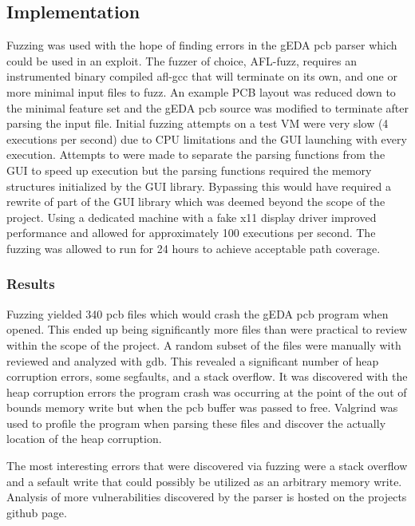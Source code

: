 \documentclass[12pt]{article}
\begin{document}
\subsection{Implementation} 
Fuzzing was used with the hope of finding errors in the gEDA pcb parser which could be used in an exploit. The fuzzer of choice, AFL-fuzz, requires an instrumented binary compiled afl-gcc that will terminate on its own, and one or more minimal input files to fuzz. An example PCB layout was reduced down to the minimal feature set and the gEDA pcb source was modified to terminate after parsing the input file. Initial fuzzing attempts on a test VM were very slow (4 executions per second) due to CPU limitations and the GUI launching with every execution. Attempts to were made to separate the parsing functions from the GUI to speed up execution but the parsing functions required the memory structures initialized by the GUI library. Bypassing this would have required a rewrite of part of the GUI library which was deemed beyond the scope of the project. Using a dedicated machine with a fake x11 display driver improved performance and allowed for approximately 100 executions per second. The fuzzing was allowed to run for 24 hours to achieve acceptable path coverage. 

\subsubsection{Results}
Fuzzing yielded 340 pcb files which would crash the gEDA pcb program when opened. This ended up being significantly more files than were practical to review within the scope of the project. A random subset of the files were manually with reviewed and analyzed with gdb. This revealed a significant number of heap corruption errors, some segfaults, and a stack overflow. It was discovered with the heap corruption errors the program crash was occurring at the point of the out of bounds memory write but when the pcb buffer was passed to free. Valgrind was used to profile the program when parsing these files and discover the actually location of the heap corruption. 

The most interesting errors that were discovered via fuzzing were a stack overflow and a sefault write that could possibly be utilized as an arbitrary memory write. Analysis of more vulnerabilities discovered by the parser is hosted on the projects github page.  
\end{document}
